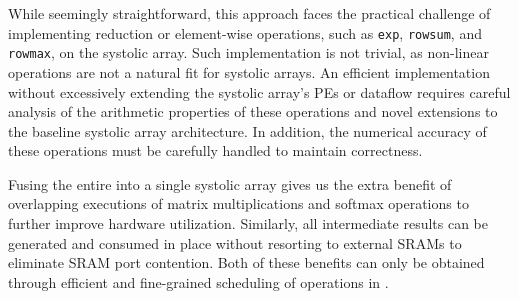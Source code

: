 While seemingly straightforward,
this approach faces the practical challenge of implementing reduction or element-wise operations,
such as \texttt{exp}, \texttt{rowsum}, and \texttt{rowmax}, on the systolic array.
Such implementation is not trivial, as non-linear operations are not a natural fit for systolic arrays.
An efficient implementation without excessively extending the systolic array's PEs or dataflow requires
careful analysis of the arithmetic properties of these operations and novel extensions to the baseline systolic array architecture.
In addition, the numerical accuracy of these operations must be carefully handled to maintain correctness.

Fusing the entire \FA{} into a single systolic array gives us the extra benefit of overlapping executions
of matrix multiplications and softmax operations to further improve hardware utilization.
Similarly, all intermediate results can be generated and consumed in place without resorting to external SRAMs to eliminate SRAM port contention.
Both of these benefits can only be obtained through efficient and fine-grained scheduling of operations in \FA{}.

